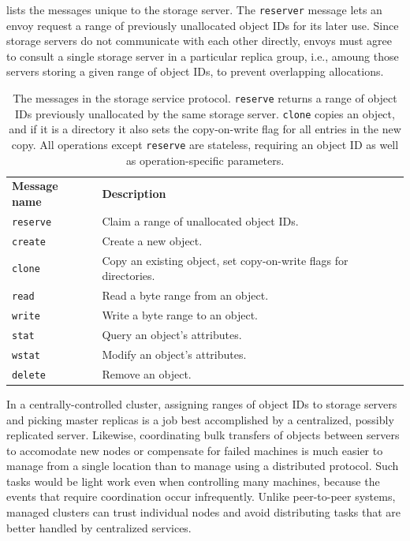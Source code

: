  lists the messages unique to the storage server. The \texttt{reserver} message lets an envoy request a range of previously unallocated object IDs for its later use. Since storage servers do not communicate with each other directly, envoys must agree to consult a single storage server in a particular replica group, i.e., amoung those servers storing a given range of object IDs, to prevent overlapping allocations.

\begin{table}[tp]
\begin{center}
\begin{tabular}{lp{8cm}}
\textbf{Message name} & \textbf{Description} \\
\texttt{reserve} & Claim a range of unallocated object IDs. \\
\texttt{create} & Create a new object. \\
\texttt{clone} & Copy an existing object, set copy-on-write flags for directories. \\
\texttt{read} & Read a byte range from an object. \\
\texttt{write} & Write a byte range to an object. \\
\texttt{stat} & Query an object's attributes. \\
\texttt{wstat} & Modify an object's attributes. \\
\texttt{delete} & Remove an object. \\
\end{tabular}
\end{center}
\caption[Additional message in the storage service protocol]{The messages in the storage service protocol. \texttt{reserve} returns a range of object IDs previously unallocated by the same storage server. \texttt{clone} copies an object, and if it is a directory it also sets the copy-on-write flag for all entries in the new copy. All operations except \texttt{reserve} are stateless, requiring an object ID as well as operation-specific parameters.}
\label{tab:storage-messages}
\end{table}

In a centrally-controlled cluster, assigning ranges of object IDs to storage servers and picking master replicas is a job best accomplished by a centralized, possibly replicated server. Likewise, coordinating bulk transfers of objects between servers to accomodate new nodes or compensate for failed machines is much easier to manage from a single location than to manage using a distributed protocol. Such tasks would be light work even when controlling many machines, because the events that require coordination occur infrequently. Unlike peer-to-peer systems, managed clusters can trust individual nodes and avoid distributing tasks that are better handled by centralized services.

